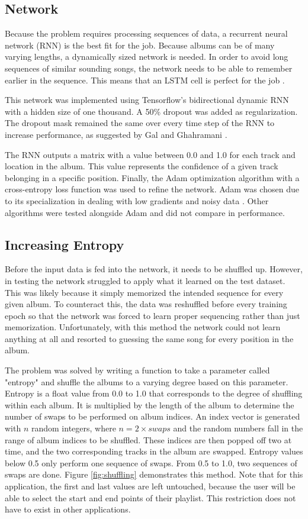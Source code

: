 \documentclass{article}
\begin{document}
\subsection{Network}
Because the problem requires processing sequences of data, a recurrent neural network (RNN) is the best fit for the job. Because albums can be of many varying lengths, a dynamically sized network is needed. In order to avoid long sequences of similar sounding songs, the network needs to be able to remember earlier in the sequence. This means that an LSTM cell is perfect for the job \cite{Olah2015Understanding}.

This network was implemented using Tensorflow's bidirectional dynamic RNN with a hidden size of one thousand. A 50\% dropout was added as regularization. The dropout mask remained the same over every time step of the RNN to increase performance, as suggested by Gal and Ghahramani \cite{Gal2016Theoretically}.

The RNN outputs a matrix with a value between 0.0 and 1.0 for each track and location in the album. This value represents the confidence of a given track belonging in a specific position. Finally, the Adam optimization algorithm with a cross-entropy loss function was used to refine the network. Adam was chosen due to its specialization in dealing with low gradients and noisy data \cite{2017Adam}. Other algorithms were tested alongside Adam and did not compare in performance.

\subsection{Increasing Entropy}
\label{sec:entropy}
Before the input data is fed into the network, it needs to be shuffled up. However, in testing the network struggled to apply what it learned on the test dataset. This was likely because it simply memorized the intended sequence for every given album. To counteract this, the data was reshuffled before every training epoch so that the network was forced to learn proper sequencing rather than just memorization. Unfortunately, with this method the network could not learn anything at all and resorted to guessing the same song for every position in the album.

The problem was solved by writing a function to take a parameter called "entropy" and shuffle the albums to a varying degree based on this parameter. Entropy is a float value from 0.0 to 1.0 that corresponds to the degree of shuffling within each album. It is multiplied by the length of the album to determine the number of swaps to be performed on album indices. An index vector is generated with $n$ random integers, where $n = 2 \times swaps$ and the random numbers fall in the range of album indices to be shuffled. These indices are then popped off two at time, and the two corresponding tracks in the album are swapped. Entropy values below 0.5 only perform one sequence of swaps. From 0.5 to 1.0, two sequences of swaps are done. Figure \ref{fig:shuffling} demonstrates this method. Note that for this application, the first and last values are left untouched, because the user will be able to select the start and end points of their playlist. This restriction does not have to exist in other applications.
\end{document}
